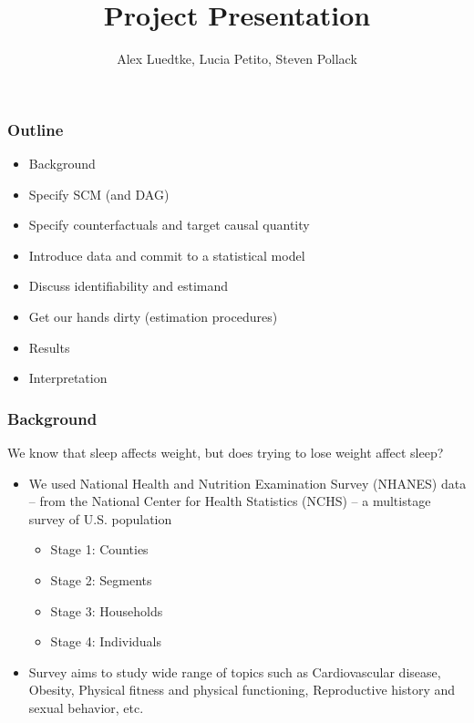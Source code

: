 \documentclass{beamer}
\title[ The effect of ``attempting to lose weight'' on sleep ]{Project Presentation}
\author{Alex Luedtke, Lucia Petito, Steven Pollack}
\institute{PHC252D}
\date{}
\begin{document}
\maketitle 
\begin{frame}
 \frametitle{Outline} %
  \begin{itemize}
    \item Background
    \item Specify SCM (and DAG)
    \item Specify counterfactuals and target causal quantity
    \item Introduce data and commit to a statistical model
    \item Discuss identifiability and estimand
    \item Get our hands dirty (estimation procedures)
    \item Results
    \item Interpretation
  \end{itemize}
\end{frame}

\begin{frame}
 \frametitle{Background}
 We know that sleep affects weight, but does trying to lose weight affect sleep?
 \begin{itemize}
  \item We used National Health and Nutrition Examination Survey (NHANES) data -- from the National Center for Health Statistics (NCHS) -- a multistage survey of U.S. population
    \begin{itemize}
      \item Stage 1: Counties
      \item Stage 2: Segments
      \item Stage 3: Households
      \item Stage 4: Individuals
    \end{itemize}
  \item Survey aims to study wide range of topics such as Cardiovascular disease, Obesity, Physical fitness and physical functioning, Reproductive history and sexual behavior, etc.
  \end{itemize}
\end{frame}
\end{document}
